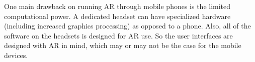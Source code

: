 		One main drawback on running AR through mobile phones is the limited computational power.  A dedicated headset can have specialized hardware (including increased graphics processing) as opposed to a phone.  Also, all of the software on the headsets is designed for AR use.  So the user interfaces are designed with AR in mind, which may or may not be the case for the mobile devices.